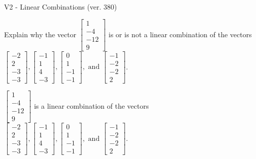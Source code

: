 \begin{exercise}
  \begin{exerciseTitle}V2 - Linear Combinations (ver. 380)\end{exerciseTitle}
  \begin{exerciseStatement}
    Explain why the vector \(\left[\begin{array}{c}
1 \\
-4 \\
-12 \\
9
\end{array}\right]\)  is or is not a linear 
	combination of the vectors \(\left[\begin{array}{c}
-2 \\
2 \\
-3 \\
-3
\end{array}\right] , \left[\begin{array}{c}
-1 \\
1 \\
4 \\
-3
\end{array}\right] , \left[\begin{array}{c}
0 \\
1 \\
-1 \\
-1
\end{array}\right] , \text{ and } \left[\begin{array}{c}
-1 \\
-2 \\
-2 \\
2
\end{array}\right]\).
	


  \end{exerciseStatement}
  \begin{exerciseAnswer}
   \(\left[\begin{array}{c}
1 \\
-4 \\
-12 \\
9
\end{array}\right]\) 
  	 is  
	a linear combination of the vectors \(\left[\begin{array}{c}
-2 \\
2 \\
-3 \\
-3
\end{array}\right] , \left[\begin{array}{c}
-1 \\
1 \\
4 \\
-3
\end{array}\right] , \left[\begin{array}{c}
0 \\
1 \\
-1 \\
-1
\end{array}\right] , \text{ and } \left[\begin{array}{c}
-1 \\
-2 \\
-2 \\
2
\end{array}\right]\).


\end{exerciseAnswer}
\end{exercise}
